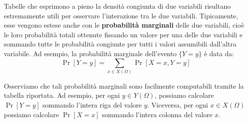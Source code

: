 \documentclass[a4paper, 12pt]{report}
\begin{document}
    Tabelle che esprimono a pieno la densità congiunta di due variabili risultano estremamente utili per osservare l'interazione tra le due variabili. Tipicamente, esse vengono estese anche con le \textbf{probabilità marginali} delle due variabili, cioè le loro probabilità totali ottenute fissando un valore per una delle due variabili e sommando tutte le probabilità congiunte per tutti i valori assumibili dall'altra variabile. Ad esempio, la probabilità marginale dell'evento $\{Y = y\}$ è data da:
    \[\Pr[Y = y] = \sum_{x \in X(\Omega)} \Pr[X = x, Y = y]\]

    Osserviamo che tali probabilità marginali sono facilmente computabili tramite la tabella riportata. Ad esempio, per ogni $y \in Y(\Omega)$, possiamo calcolare $\Pr[Y = y]$ sommando l'intera riga del valore $y$. Viceversa, per ogni $x \in X(\Omega)$ possiamo calcolare $\Pr[X = x]$ sommando l'intera colonna del valore $x$.
\end{document}
